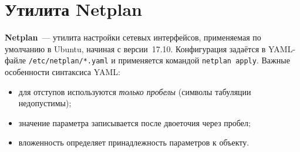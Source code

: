 \section{Утилита Netplan}
\label{sec:netplan}

\textbf{Netplan}~— утилита настройки сетевых интерфейсов, применяемая по
умолчанию в Ubuntu, начиная с версии~17.10. Конфигурация задаётся в YAML-файле
\texttt{/etc/netplan/*.yaml} и применяется командой \texttt{netplan apply}.
Важные особенности синтаксиса YAML:
\begin{itemize}
  \item для отступов используются \textit{только пробелы} (символы табуляции
    недопустимы);
  \item значение параметра записывается после двоеточия через пробел;
  \item вложенность определяет принадлежность параметров к объекту.
\end{itemize}
